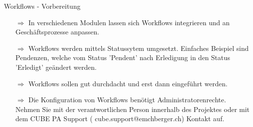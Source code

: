 \documentclass{article}
\begin{document}
\begin{beamerlikethm}{Workflows - Vorbereitung}
\begin{itemize}
  \item[$\Longrightarrow$] In verschiedenen Modulen lassen sich Workflows integrieren und an Geschäftsprozesse anpassen.
  \item[$\Longrightarrow$] Workflows werden mittels Statussytem umgesetzt. Einfaches Beispiel sind Pendenzen, welche vom Status 'Pendent' nach Erledigung in den Status 'Erledigt' geändert werden.
  \item[$\Longrightarrow$] Workflows sollen gut durchdacht und erst dann eingeführt werden.
  \item[$\Longrightarrow$] Die Konfiguration von Workflows benötigt Administratorenrechte. Nehmen Sie mit der verantwortlichen Person innerhalb des Projektes oder mit dem CUBE PA Support ({\color{red} cube.support@emchberger.ch}) Kontakt auf. 
\end{itemize}
\end{beamerlikethm}

\vspace{\baselineskip}

\end{document}
